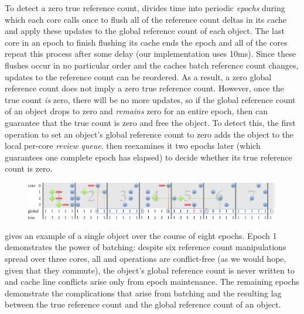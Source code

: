 To detect a zero true reference count,  divides time into
periodic \emph{epochs} during which each core calls  once
to flush all of the
reference count deltas in its cache and apply these updates to the
global reference count of each object.  The last core in an epoch to
finish flushing its cache ends the epoch and all of the cores repeat
this process after some delay (our implementation uses 10ms).  Since
these flushes occur in no particular order and the caches batch
reference count changes, updates to the reference count can be
reordered.  As a result, a zero global reference count does not imply
a zero true reference count.  However, once the true count \emph{is}
zero, there will be no more updates, so if the global reference count
of an object drops to zero and \emph{remains} zero for an entire
epoch, then  can guarantee that the true count is zero
and free the object.  To detect this, the first 
operation to set an object's global reference count to zero adds the
object to the local per-core \emph{review queue}.   then
reexamines it two epochs later (which
guarantees one complete epoch has elapsed) to decide whether its true
reference count is zero.

\begin{figure}
  \centering
  \includegraphics[width=\textwidth]{figures/refcache.pdf}
  \label{fig:refcache-ex}
\end{figure}

 gives an example of a single object over
the course of eight epochs.  Epoch 1 demonstrates the power of
batching: despite six reference count manipulations spread over three
cores, all  and  operations are conflict-free (as
we would hope, given that they commute), the object's global reference
count is never written to and
cache line conflicts arise only from epoch maintenance.  The
remaining epochs demonstrate the complications that arise from
batching and the resulting lag between the true reference count and
the global reference count of an object.

